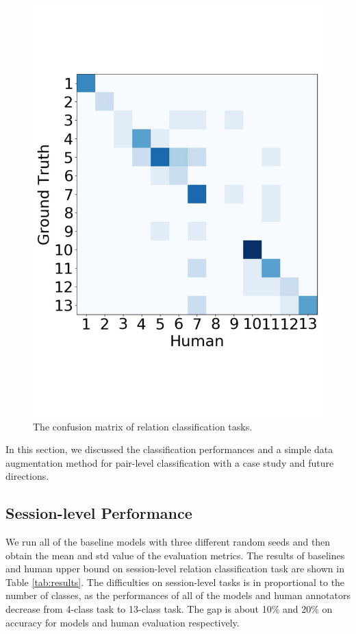 \begin{figure}
{\begin{minipage}{0.25\linewidth}
			\includegraphics[width=1\linewidth]{human_13_pair}
	\end{minipage}}
	\vspace{-1cm}
	\caption{The confusion matrix of relation classification tasks.}
	\label{fig:confusion}
\end{figure}
In this section, we discussed the classification performances and a simple data augmentation method for pair-level classification with a case study and future directions.
\subsection{Session-level Performance}
We run all of the baseline models with three different random seeds and then obtain the mean and
std value of the evaluation metrics. The results of baselines and human upper bound on session-level relation classification task 
are shown in Table \ref{tab:results}. The difficulties on session-level tasks is in proportional to the number of classes, as the performances of all of the models and human annotators decrease from 4-class task to 13-class task. The gap is about 10\% and 20\% on accuracy for models and human evaluation respectively. 

